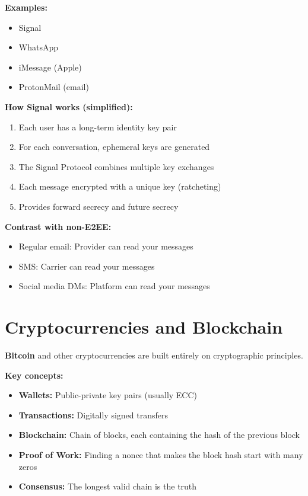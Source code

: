 \documentclass[11pt,a4paper]{report}
\begin{document}
\textbf{Examples:}
\begin{itemize}
\item Signal
\item WhatsApp
\item iMessage (Apple)
\item ProtonMail (email)
\end{itemize}

\textbf{How Signal works (simplified):}
\begin{enumerate}
\item Each user has a long-term identity key pair
\item For each conversation, ephemeral keys are generated
\item The Signal Protocol combines multiple key exchanges
\item Each message encrypted with a unique key (ratcheting)
\item Provides forward secrecy and future secrecy
\end{enumerate}

\textbf{Contrast with non-E2EE:}
\begin{itemize}
\item Regular email: Provider can read your messages
\item SMS: Carrier can read your messages
\item Social media DMs: Platform can read your messages
\end{itemize}

\section{Cryptocurrencies and Blockchain}

\textbf{Bitcoin} and other cryptocurrencies are built entirely on cryptographic principles.

\textbf{Key concepts:}
\begin{itemize}
\item \textbf{Wallets:} Public-private key pairs (usually ECC)
\item \textbf{Transactions:} Digitally signed transfers
\item \textbf{Blockchain:} Chain of blocks, each containing the hash of the previous block
\item \textbf{Proof of Work:} Finding a nonce that makes the block hash start with many zeros
\item \textbf{Consensus:} The longest valid chain is the truth
\end{itemize}
\end{document}
